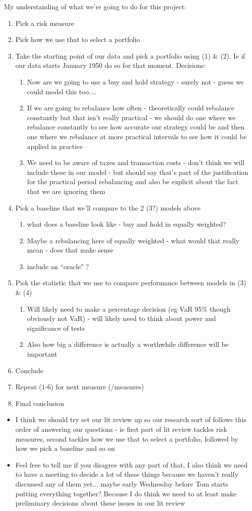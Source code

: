 \documentclass[12pt,a4paper]{article}
\newcommand{\bi}{\begin{itemize}}
\newcommand{\ei}{\end{itemize}}
\newcommand{\be}{\begin{enumerate}}
\newcommand{\ee}{\end{enumerate}}
\begin{document}
My understanding of what we're going to do for this project:

\be
\item Pick a risk measure
\item Pick how we use that to select a portfolio
\item Take the starting point of our data and pick a portfolio using (1) \& (2). Ie if our data starts January 1950 do so for that moment. Decisions:  
\be
	\item Now are we going to use a buy and hold strategy - surely not - guess we could model this too....
	\item If we are going to rebalance how often - theoretically could rebalance constantly but that isn't really practical - we should do one where we rebalance constantly to see how accurate our strategy could be and then one where we rebalance at more practical intervals to see how it could be applied in practice 
	\item We need to be aware of taxes and transaction costs - don't think we will include these in our model - but should say that's part of the justification for the practical period rebalancing and also be explicit about the fact that we are ignoring them
	\ee
\item Pick a baseline that we'll compare to the 2 (3?) models above
\be
	\item what does a baseline look like - buy and hold in equally weighted? 
	\item  Maybe a rebalancing here of equally weighted - what would that really mean - does that make sense
	\item include an ``oracle" ?
	\ee
\item Pick the statistic that we use to compare performance between models in (3) \& (4) 
\be
	\item Will likely need to make a percentage decision (eg VaR 95\% though obviously not VaR) - will likely need to think about power and significance of tests
	\item Also how big a difference is actually a worthwhile difference will be important
	\ee
\item Conclude
\item Repeat (1-6) for next measure (/measures)
\item Final conclusion
\ee

\bi
\item I think we should try set our lit review up so our research sort of follows this order of answering our questions - ie first part of lit review tackles risk measures, second tackles how we use that to select a portfolio, followed by how we pick a baseline and so on
\item Feel free to tell me if you disagree with any part of that, I also think we need to have a meeting to decide a lot of these things because we haven't really discussed any of them yet... maybe early Wednesday before Tom starts putting everything together? Because I do think we need to at least make preliminary decisions about these issues in our lit review 
\ei
 
\end{document}
